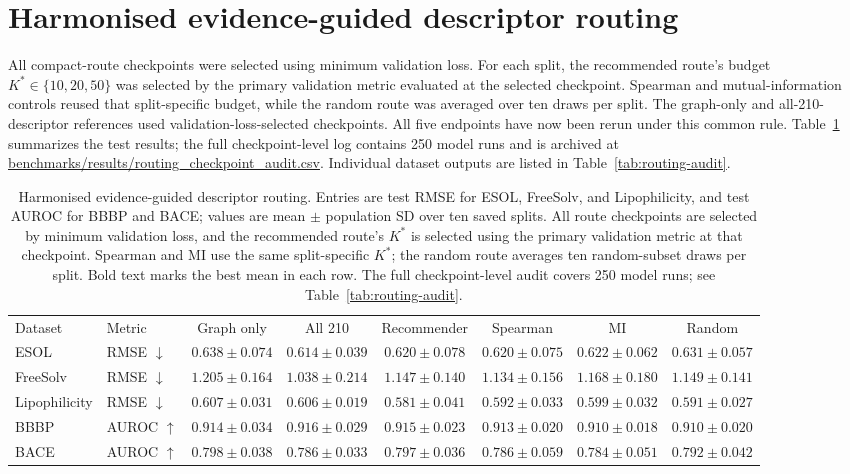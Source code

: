 \documentclass[10pt,a4paper]{article}
\renewcommand{\thetable}{S\arabic{table}}
\begin{document}
\section*{Harmonised evidence-guided descriptor routing}

All compact-route checkpoints were selected using minimum validation loss. For each split, the recommended route's budget $K^*\in\{10,20,50\}$ was selected by the primary validation metric evaluated at the selected checkpoint. Spearman and mutual-information controls reused that split-specific budget, while the random route was averaged over ten draws per split. The graph-only and all-210-descriptor references used validation-loss-selected checkpoints. All five endpoints have now been rerun under this common rule. Table~\ref{tab:routing-si} summarizes the test results; the full checkpoint-level log contains 250 model runs and is archived at \url{benchmarks/results/routing_checkpoint_audit.csv}. Individual dataset outputs are listed in Table~\ref{tab:routing-audit}.

\begin{table}[t]
\renewcommand{\thetable}{S10}
\caption{Harmonised evidence-guided descriptor routing. Entries are test RMSE for ESOL, FreeSolv, and Lipophilicity, and test AUROC for BBBP and BACE; values are mean $\pm$ population SD over ten saved splits. All route checkpoints are selected by minimum validation loss, and the recommended route's $K^*$ is selected using the primary validation metric at that checkpoint. Spearman and MI use the same split-specific $K^*$; the random route averages ten random-subset draws per split. Bold text marks the best mean in each row. The full checkpoint-level audit covers 250 model runs; see Table~\ref{tab:routing-audit}.}
\label{tab:routing-si}
\centering
\footnotesize
\setlength{\tabcolsep}{2.4pt}
\begin{tabular}{@{}llcccccc@{}}
\toprule
Dataset & Metric & Graph only & All 210 & Recommender & Spearman & MI & Random \\
ESOL & RMSE $\downarrow$ & $0.638\pm0.074$ & $\mathbf{0.614\pm0.039}$ & $0.620\pm0.078$ & $0.620\pm0.075$ & $0.622\pm0.062$ & $0.631\pm0.057$ \\
FreeSolv & RMSE $\downarrow$ & $1.205\pm0.164$ & $\mathbf{1.038\pm0.214}$ & $1.147\pm0.140$ & $1.134\pm0.156$ & $1.168\pm0.180$ & $1.149\pm0.141$ \\
Lipophilicity & RMSE $\downarrow$ & $0.607\pm0.031$ & $0.606\pm0.019$ & $\mathbf{0.581\pm0.041}$ & $0.592\pm0.033$ & $0.599\pm0.032$ & $0.591\pm0.027$ \\
BBBP & AUROC $\uparrow$ & $0.914\pm0.034$ & $\mathbf{0.916\pm0.029}$ & $0.915\pm0.023$ & $0.913\pm0.020$ & $0.910\pm0.018$ & $0.910\pm0.020$ \\
BACE & AUROC $\uparrow$ & $\mathbf{0.798\pm0.038}$ & $0.786\pm0.033$ & $0.797\pm0.036$ & $0.786\pm0.059$ & $0.784\pm0.051$ & $0.792\pm0.042$ \\
\bottomrule
\end{tabular}
\end{table}
\end{document}

